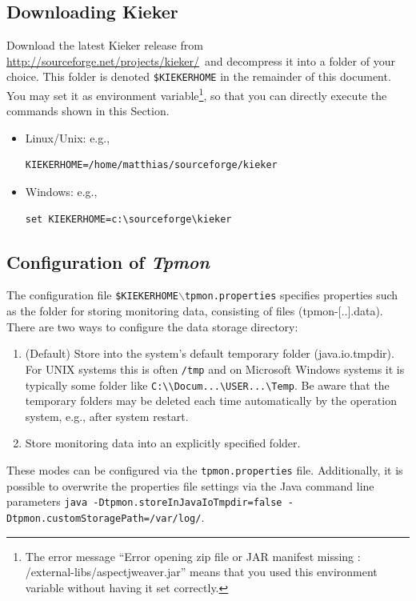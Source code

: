 \documentclass[a4paper,12pt]{scrartcl}
\newcommand{\tpmon}{\textit{Tpmon}}
\newcommand{\kieker}{\textit{Kieker}}
\newcommand{\kiekerurl}{\small\url{http://sourceforge.net/projects/kieker/}\normalsize}
\begin{document}
\subsection{Downloading Kieker}
Download the latest Kieker release from \kiekerurl \ and decompress it into a folder of your choice. This folder is denoted \texttt{\$KIEKERHOME} in the remainder of this document. You may set it as environment variable\footnote{The error message ``Error opening zip file or JAR manifest missing : /external-libs/aspectjweaver.jar'' means that you used this environment variable without having it set correctly.}, so that you can directly execute the commands shown in this Section.
\begin{itemize}
 \item Linux/Unix: e.g., %
\begin{lstlisting}[caption={}] 
KIEKERHOME=/home/matthias/sourceforge/kieker
\end{lstlisting}
\item Windows: e.g.,
\begin{lstlisting}[caption={}]
set KIEKERHOME=c:\sourceforge\kieker
\end{lstlisting}
\end{itemize}

\subsection{Configuration of \tpmon}
The configuration file \texttt{\$KIEKERHOME}$\backslash$\texttt{tpmon.properties} specifies properties such as the folder for storing monitoring data, consisting of files (tpmon-[..].data). There are two ways to configure the data storage directory: 
\begin{enumerate}
\item (Default) Store into the system's default temporary folder (java.io.tmpdir). For UNIX systems this is often \texttt{/tmp} and on Microsoft Windows systems it is typically some folder like \verb=C:\\Docum...\USER...\Temp=. Be aware that the temporary folders may be deleted each time automatically by the operation system, e.g., after system restart.
\item Store monitoring data into an explicitly specified folder.
\end{enumerate}
These modes can be configured via the \texttt{tpmon.properties} file. Additionally, it is possible to overwrite the properties file settings via the Java command line parameters \footnotesize \texttt{java -Dtpmon.storeInJavaIoTmpdir=false -Dtpmon.customStoragePath=/var/log/}. \normalsize
\end{document}

